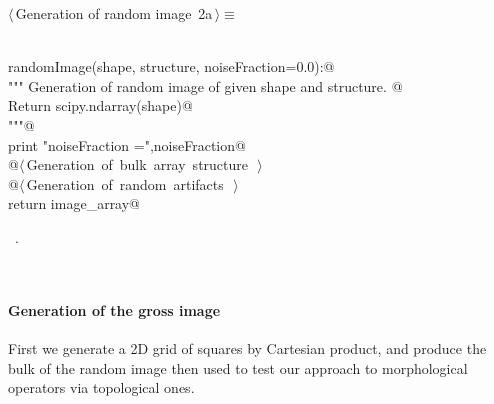 \documentclass[11pt,oneside]{article}	%
\begin{document}
\begin{flushleft} \small
\begin{minipage}{\linewidth} \label{scrap1}
\protect{}$\langle\,$Generation of random image\nobreak\ {\footnotesize 2a}$\,\rangle\equiv$
\vspace{-1ex}
\begin{list}{}{} \item
\mbox{}\verb@@\\
\mbox{}\verb@def randomImage(shape, structure, noiseFraction=0.0):@\\
\mbox{}\verb@   """ Generation of random image of given shape and structure. @\\
\mbox{}\verb@      Return scipy.ndarray(shape)@\\
\mbox{}\verb@   """@\\
\mbox{}\verb@   print "noiseFraction =",noiseFraction@\\
\mbox{}\verb@   @\hbox{$\langle\,$Generation of bulk array structure\nobreak\ {\footnotesize {}}$\,\rangle$}\verb@@\\
\mbox{}\verb@   @\hbox{$\langle\,$Generation of random artifacts\nobreak\ {\footnotesize {}}$\,\rangle$}\verb@@\\
\mbox{}\verb@   return image_array@\\
\mbox{}\verb@@{\NWsep}
\end{list}
\vspace{-1ex}
\footnotesize\addtolength{\baselineskip}{-1ex}
\begin{list}{}{\setlength{\itemsep}{-\parsep}\setlength{\itemindent}{-\leftmargin}}
\item \NWtxtMacroRefIn\ .
\end{list}
\end{minipage}\\[4ex]
\end{flushleft}


\paragraph{Generation of the gross image}
First we generate a 2D grid of squares by Cartesian product, and produce the bulk of the random image then used to test our approach to morphological operators via topological ones.
\end{document}
